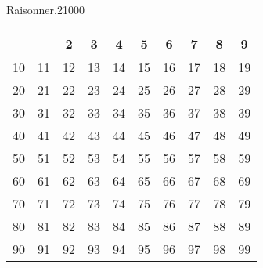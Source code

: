 \begin{pageParcourst}
\begin{ExoCtN}{Raisonner.}{2}{1}{0}{0}{0}
\begin{minipage}{0.5\linewidth}
 


\begin{tabular}{|c|c|c|c|c|c|c|c|c|c|}
 \hline 
 &  & 2 & 3 & 4 & 5 & 6 & 7 & 8 & 9 \\ 
 \hline 
 10&11 & 12 & 13 & 14 & 15 & 16 & 17 & 18 & 19 \\
 \hline 
 20&21 & 22 & 23 & 24 & 25 & 26 & 27 & 28 & 29 \\
 \hline 
 30&31 & 32 & 33 & 34 & 35 & 36 & 37 & 38 & 39 \\
 \hline 
 40&41 & 42 & 43 & 44 & 45 & 46 & 47 & 48 & 49 \\
 \hline 
 50&51 & 52 & 53 & 54 & 55 & 56 & 57 & 58 & 59 \\
 \hline 
 60&61 & 62 & 63 & 64 & 65 & 66 & 67 & 68 & 69 \\
 \hline 
 70&71 & 72 & 73 & 74 & 75 & 76 & 77 & 78 & 79 \\
 \hline 
 80&81 & 82 & 83 & 84 & 85 & 86 & 87 & 88 & 89 \\
 \hline 
 90&91 & 92 & 93 & 94 & 95 & 96 & 97 & 98 & 99 \\
 \hline 
 \end{tabular}  
 
 \end{minipage}


 
\end{ExoCtN}
 
\end{pageParcourst}
%




